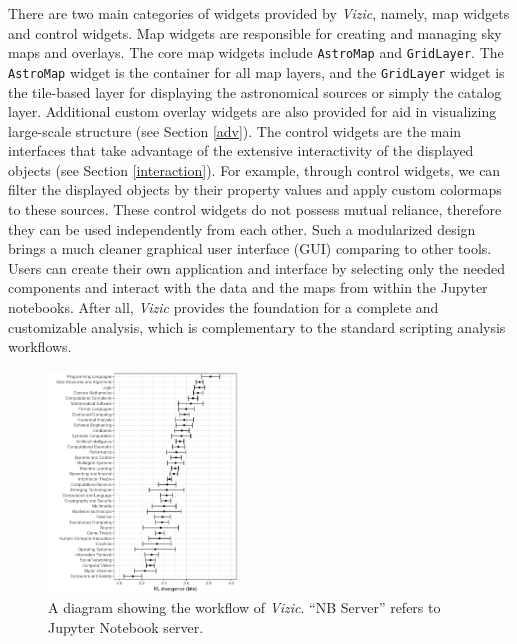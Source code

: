 \documentclass[5p,authoryear]{elsarticle}
\begin{document}
There are two main categories of widgets provided by \textit{Vizic}, namely, map widgets and control widgets. Map widgets are responsible for creating and managing sky maps and overlays. The core map widgets include \texttt{AstroMap} and \texttt{GridLayer}. The \texttt{AstroMap} widget is the container for all map layers, and the \texttt{GridLayer} widget is the tile-based layer for displaying the astronomical sources or simply the catalog layer. Additional custom overlay widgets are also provided for aid in visualizing large-scale structure (see Section \ref{adv}).
The control widgets are the main interfaces that take advantage of the extensive interactivity of the displayed objects (see Section \ref{interaction}).
For example, through control widgets, we can filter the displayed objects by their property values and apply custom colormaps to these sources. These control widgets do not possess mutual reliance, therefore they can be used independently from each other.
Such a modularized design brings a much cleaner graphical user interface (GUI) comparing to other tools. Users can create their own application and interface by selecting only the needed components and interact with the data and the maps from within the Jupyter notebooks.
After all, \textit{Vizic} provides the foundation for a complete and customizable analysis, which is complementary to the standard scripting analysis workflows.
\begin{figure}[h]
  \centering
  \includegraphics[width=0.45\textwidth]{FIG1}
  \caption{A diagram showing the workflow of \textit{Vizic}. ``NB Server'' refers to Jupyter Notebook server.}
  \label{fig:model_d}
\end{figure}
\end{document}
